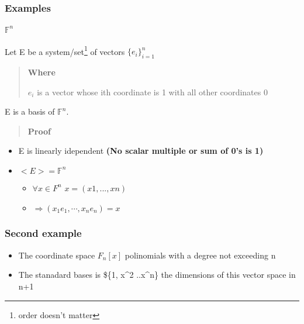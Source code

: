 \documentclass[twocolumn]{article}
\providecommand{\tightlist}{%
  \setlength{\itemsep}{0pt}\setlength{\parskip}{0pt}}
\let\oldparagraph\paragraph
\renewcommand{\paragraph}[1]{\oldparagraph{#1}\mbox{}}
\begin{document}
\hypertarget{examples}{%
\subsubsection{Examples}\label{examples}}

\hypertarget{mathbbfn}{%
\paragraph{\texorpdfstring{\(\mathbb{F}^n\)}{\textbackslash{}mathbb\{F\}\^{}n}}\label{mathbbfn}}

Let E be a system/set\footnote{order doesn't matter} of vectors
\(\{e_i\}_{i=1}^n\)

\begin{quote}
\textbf{Where}

\(e_i\) is a vector whose ith coordinate is 1 with all other coordinates
0
\end{quote}

E is a basis of \(\mathbb{F}^n\).

\begin{quote}
\textbf{Proof}
\end{quote}

\begin{itemize}
\tightlist
\item
  E is linearly idependent \textbf{(No scalar multiple or sum of 0's is
  1)}
\item
  \(<E> = \mathbb{F}^n\)

  \begin{itemize}
  \tightlist
  \item
    \(\forall x \in F^n\) \(x = (x1, ... ,xn)\)
  \item
    \(\Rightarrow(x_1e_1, \cdots, x_ne_n) = x\)
  \end{itemize}
\end{itemize}

\hypertarget{second-example}{%
\subsubsection{Second example}\label{second-example}}

\begin{itemize}
\tightlist
\item
  The coordinate space \(F_n[x]\) polinomials with a degree not
  exceeding n
\item
  The stanadard bases is \$\{1, x\^{}2 ..x\^{}n\} the dimensions of this
  vector space in n+1
\end{itemize}
\end{document}
